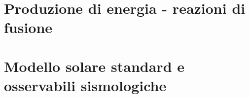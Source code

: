 \begin{comment}%
\begin{minipage}{\linewidth}
\begin{tikzpicture}
\node[inner sep=0pt] (image) at (0,0)
  {\texttt{[image: Hdiffusion]}};
  \draw [thick,dotted] (-3.4,1.5) -- (-3,1.5) node[right] {$\propto\nabla c$};
 \draw [thick,dashed] (-3.4,1.9) -- (-3,1.9) node[right] {$\propto\nabla T$};
    \draw [thick,dash dot] (-3.4,2.3) -- (-3,2.3) node[right] {$\propto\nabla P$};
    \node (caption) at (8.5,-2.5) { \begin{minipage}[c]{0.48\textwidth}
\captionof{figure}{Contributi alla velocit\'a di diffusione di H-He in modello solare. Da \cite{wam88hydrogen}.}%
    \end{minipage}};
\node[] (massconsdiff) at (8.5,1) {\begin{minipage}[c]{0.48\textwidth}
\end{minipage}
};
\end{tikzpicture}
\end{minipage}
\end{comment}


\section{Produzione di energia - reazioni di fusione}


\section{Modello solare standard e osservabili sismologiche}


